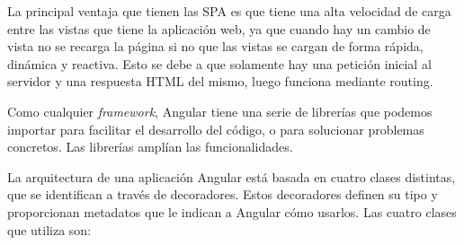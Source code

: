 \documentclass[a4paper, 12pt]{book}
\begin{document}
La principal ventaja que tienen las SPA es que tiene una alta velocidad de carga entre las vistas que tiene la aplicación web, ya que cuando hay un cambio de vista no se recarga la página si no que las vistas se cargan de forma rápida, dinámica y reactiva. Esto se debe a que solamente hay una petición inicial al servidor y una respuesta HTML del mismo, luego funciona mediante routing.

Como cualquier \emph{framework}, Angular tiene una serie de librerías que podemos
importar para facilitar el desarrollo del código, o para solucionar problemas
concretos. Las librerías amplían las funcionalidades.

La arquitectura de una aplicación Angular está basada en cuatro clases distintas, que se identifican a través de decoradores. Estos decoradores definen su tipo y proporcionan metadatos que le indican a Angular cómo usarlos.
Las cuatro clases que utiliza son:
\end{document}

